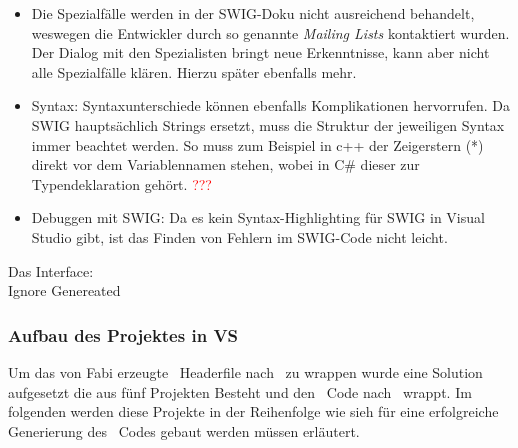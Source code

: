 \begin{itemize}
\begin{itemize}
	\end{itemize}
\item Die Spezialfälle werden in der SWIG-Doku nicht ausreichend behandelt, weswegen die Entwickler durch so genannte \emph{Mailing Lists} kontaktiert wurden. Der Dialog mit den Spezialisten bringt neue Erkenntnisse, kann aber nicht alle Spezialfälle klären. Hierzu später ebenfalls mehr.
\item Syntax: Syntaxunterschiede können ebenfalls Komplikationen hervorrufen. Da SWIG hauptsächlich Strings ersetzt, muss die Struktur der jeweiligen Syntax immer beachtet werden. So muss zum Beispiel in c++ der Zeigerstern (*) direkt vor dem Variablennamen stehen, wobei in C\# dieser zur Typendeklaration gehört. \textcolor{red}{???}
\item Debuggen mit SWIG: Da es kein Syntax-Highlighting für SWIG in Visual Studio gibt, ist das Finden von Fehlern im SWIG-Code nicht leicht.  
\end{itemize}


Das Interface:\\
	
	
		


	Ignore Genereated\\


\subsubsection{Aufbau des Projektes in VS}\label{subsubsec:Aufbau}

Um das von Fabi erzeugte \CC~Headerfile nach \CS~zu wrappen wurde eine Solution aufgesetzt die aus fünf Projekten Besteht und den \CC~Code nach \CS~wrappt. Im folgenden werden diese Projekte in der Reihenfolge wie sieh für eine erfolgreiche Generierung des \CS~Codes gebaut werden müssen erläutert.\\


